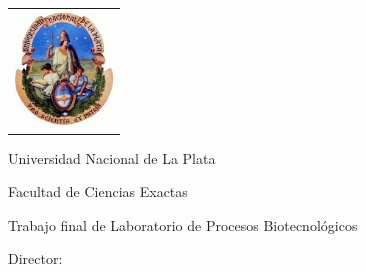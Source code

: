\newcommand{\HRule}{\rule{\linewidth}{0.2mm}}
%
\thispagestyle{empty}

\begin{center}\leavevmode

\vspace{-2cm}

\begin{tabular}{l}
\includegraphics[width=2.6cm]{img/logo-unlp.jpeg}
\end{tabular}


{\large \sc Universidad Nacional de La Plata

Facultad de Ciencias Exactas
}

\vspace{5.0cm}


{\huge\bf \tituloTesis}

\vspace{2cm}
% 
{\large Trabajo final de Laboratorio de Procesos Biotecnológicos}

\vspace{2cm}

{\Large \autor}

\end{center}

\vfill

{\large

{Director: \director}

\vspace{.2cm}


\vspace{.2cm}

\lugar
}

\newpage\thispagestyle{empty}
